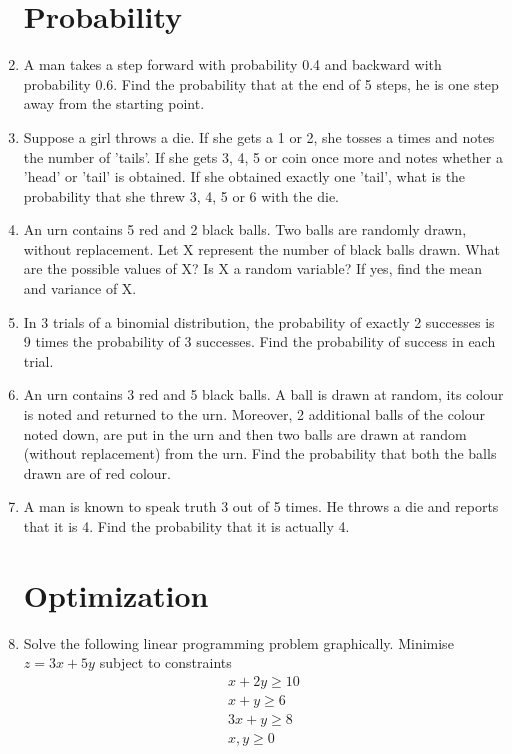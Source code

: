 \documentclass[12pt,-letter paper]{article}
\begin{document}
\begin{enumerate}
\section{Probability}
	\item A man takes a step forward with probability 0.4 and backward with probability 0.6. Find the probability that at the end of 5 steps, he is one step away from the starting point.


	\item Suppose a girl throws a die. If she gets a 1 or 2, she tosses a times and notes the number of 'tails'. If she gets 3, 4, 5 or coin once more and notes whether a 'head' or 'tail' is obtained. If she obtained exactly one 'tail', what is the probability that she threw 3, 4, 5 or 6 with the die.


	\item An urn contains 5 red and 2 black balls. Two balls are randomly drawn, without replacement. Let X represent the number of black balls drawn. What are the possible values of X? Is X a random variable? If yes, find the mean and variance of X.

	\item In 3 trials of a binomial distribution, the probability of exactly 2 successes is 9 times the probability of 3 successes. Find the probability of success in each trial.

	\item An urn contains 3 red and 5 black balls. A ball is drawn at random, its colour is noted and returned to the urn. Moreover, 2 additional balls of the colour noted down, are put in the urn and then two balls are drawn at random (without replacement) from the urn. Find the probability that both the balls drawn are of red colour.
     \item A man is known to speak truth 3 out of 5 times. He throws a die and reports that it is 4. Find the probability that it is actually 4.

\section{Optimization}
	\item Solve the following linear programming problem graphically. Minimise $z = 3x+5y$ subject to constraints
     \begin{align*}
         x+2y\ge 10\\
         x+y\ge 6\\
         3x+y\ge8\\
         x,y\ge0
     \end{align*}
 

\end{enumerate}
\end{document}
